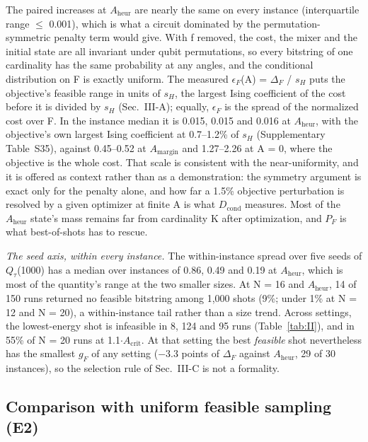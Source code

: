 \documentclass[journal]{IEEEtran}
\begin{document}
The paired increases at $A_{\mathrm{heur}}$ are nearly the same on every instance (interquartile range $\leq$ 0.001), which is what a circuit dominated by the permutation-symmetric penalty term would give. With f removed, the cost, the mixer and the initial state are all invariant under qubit permutations, so every bitstring of one cardinality has the same probability at any angles, and the conditional distribution on F is exactly uniform. The measured $\epsilon_{F}$(A) = $\Delta_{F}$ / $s_{H}$ puts the objective's feasible range in units of $s_{H}$, the largest Ising coefficient of the cost before it is divided by $s_{H}$ (Sec.~III-A); equally, $\epsilon_{F}$ is the spread of the normalized cost over F. In the instance median it is 0.015, 0.015 and 0.016 at $A_{\mathrm{heur}}$, with the objective's own largest Ising coefficient at 0.7--1.2\% of $s_{H}$ (Supplementary Table~S35), against 0.45--0.52 at $A_{\mathrm{margin}}$ and 1.27--2.26 at A = 0, where the objective is the whole cost. That scale is consistent with the near-uniformity, and it is offered as context rather than as a demonstration: the symmetry argument is exact only for the penalty alone, and how far a 1.5\% objective perturbation is resolved by a given optimizer at finite A is what $D_{\mathrm{cond}}$ measures. Most of the $A_{\mathrm{heur}}$ state's mass remains far from cardinality K after optimization, and $P_{F}$ is what best-of-shots has to rescue.


\textit{The seed axis, within every instance.} The within-instance spread over five seeds of $Q_{\tau}$(1000) has a median over instances of 0.86, 0.49 and 0.19 at $A_{\mathrm{heur}}$, which is most of the quantity's range at the two smaller sizes. At N = 16 and $A_{\mathrm{heur}}$, 14 of 150 runs returned no feasible bitstring among 1,000 shots (9\%; under 1\% at N = 12 and N = 20), a within-instance tail rather than a size trend. Across settings, the lowest-energy shot is infeasible in 8, 124 and 95 runs (Table~\ref{tab:II}), and in 55\% of N = 20 runs at 1.1$\cdot$$A_{\mathrm{crit}}$. At that setting the best \textit{feasible} shot nevertheless has the smallest $g_{F}$ of any setting ($-$3.3 points of $\Delta_{F}$ against $A_{\mathrm{heur}}$, 29 of 30 instances), so the selection rule of Sec.~III-C is not a formality.


\subsection{Comparison with uniform feasible sampling (E2)}
\end{document}
